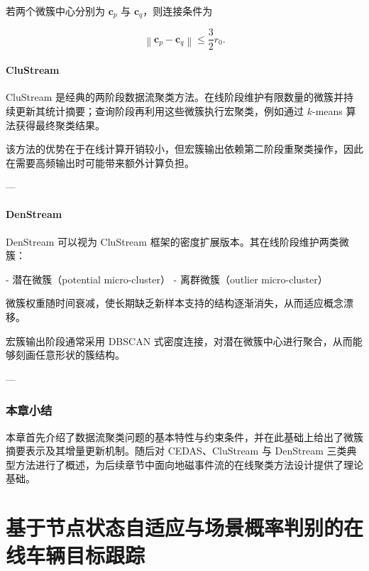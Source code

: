 \documentclass{xdupgthesis}
\begin{document}
若两个微簇中心分别为 $\mathbf{c}_p$ 与 $\mathbf{c}_q$，则连接条件为

\begin{equation}
	\left\|
	\mathbf{c}_p-\mathbf{c}_q
	\right\|
	\le
	\frac{3}{2}r_0 .
\end{equation}



\subsubsection{CluStream}

CluStream 是经典的两阶段数据流聚类方法。在线阶段维护有限数量的微簇并持续更新其统计摘要；查询阶段再利用这些微簇执行宏聚类，例如通过 $k$-means 算法获得最终聚类结果。

该方法的优势在于在线计算开销较小，但宏簇输出依赖第二阶段重聚类操作，因此在需要高频输出时可能带来额外计算负担。

---

\subsubsection{DenStream}

DenStream 可以视为 CluStream 框架的密度扩展版本。其在线阶段维护两类微簇：

- 潜在微簇（potential micro-cluster）
- 离群微簇（outlier micro-cluster）

微簇权重随时间衰减，使长期缺乏新样本支持的结构逐渐消失，从而适应概念漂移。

宏簇输出阶段通常采用 DBSCAN 式密度连接，对潜在微簇中心进行聚合，从而能够刻画任意形状的簇结构。

---

\subsection{本章小结}

本章首先介绍了数据流聚类问题的基本特性与约束条件，并在此基础上给出了微簇摘要表示及其增量更新机制。随后对 CEDAS、CluStream 与 DenStream 三类典型方法进行了概述，为后续章节中面向地磁事件流的在线聚类方法设计提供了理论基础。


\chapter{基于节点状态自适应与场景概率判别的在线车辆目标跟踪}
\label{chap:online_tracking}
\end{document}
